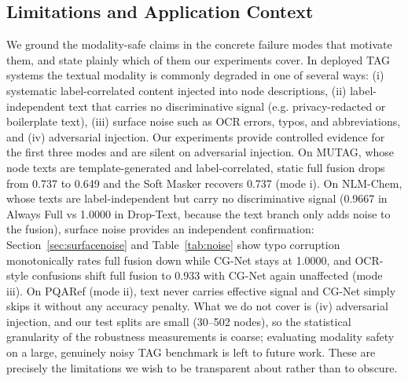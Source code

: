 \documentclass[preprint,12pt,authoryear]{elsarticle}
\begin{document}
\subsection{Limitations and Application Context}
We ground the modality-safe claims in the concrete failure modes that motivate them, and state plainly which of them our experiments cover. In deployed TAG systems the textual modality is commonly degraded in one of several ways: (i) systematic label-correlated content injected into node descriptions, (ii) label-independent text that carries no discriminative signal (e.g. privacy-redacted or boilerplate text), (iii) surface noise such as OCR errors, typos, and abbreviations, and (iv) adversarial injection. Our experiments provide controlled evidence for the first three modes and are silent on adversarial injection. On MUTAG, whose node texts are template-generated and label-correlated, static full fusion drops from 0.737 to 0.649 and the Soft Masker recovers 0.737 (mode i). On NLM-Chem, whose texts are label-independent but carry no discriminative signal (0.9667 in Always Full vs 1.0000 in Drop-Text, because the text branch only adds noise to the fusion), surface noise provides an independent confirmation: Section~\ref{sec:surfacenoise} and Table~\ref{tab:noise} show typo corruption monotonically rates full fusion down while CG-Net stays at 1.0000, and OCR-style confusions shift full fusion to 0.933 with CG-Net again unaffected (mode iii). On PQARef (mode ii), text never carries effective signal and CG-Net simply skips it without any accuracy penalty. What we do not cover is (iv) adversarial injection, and our test splits are small (30--502 nodes), so the statistical granularity of the robustness measurements is coarse; evaluating modality safety on a large, genuinely noisy TAG benchmark is left to future work. These are precisely the limitations we wish to be transparent about rather than to obscure.
\end{document}
